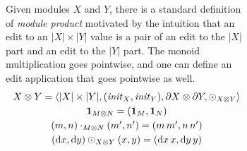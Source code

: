 \begin{figure}
\begin{figure}
Given modules $X$ and $Y$, there is a standard definition of {\em module
  product} 
motivated by the intuition that an edit to an $|X| \times |Y|$ value is a
pair of an edit to the $|X|$ part and an edit to the $|Y|$ part. The monoid
multiplication goes pointwise, and one can define an edit application that
goes pointwise as well.
\[
\begin{array}{@{}c@{}}
X \otimes Y = \left<|X| \times |Y|,(\init_X,\init_Y),\partial X \otimes
\partial Y,\odot_{X \otimes Y}\right> \\[.6ex]
\ONE_{M \otimes N} = (\ONE_M,\ONE_N) \\[.6ex]
(m,n)\cdot_{M \otimes N}(m',n') = (m\,m', n\,n')\\[.6ex]
(\dx,\dy)\odot_{X \otimes Y}(x,y) = (\dx\,x,\dy\,y)
\end{array}
\]


\end{figure}
\end{figure}
